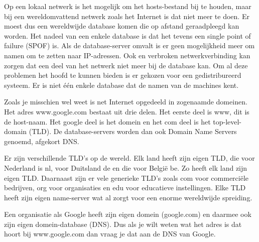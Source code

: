 Op een lokaal netwerk is het mogelijk om het hosts-bestand bij te houden, maar bij een wereldomvattend netwerk zoals het Internet is dat niet meer te doen. Er moest dus een wereldwijde database komen die op afstand geraadpleegd kan worden. Het nadeel van een enkele database is dat het tevens een single point of failure (SPOF) is. Als de database-server omvalt is er geen mogelijkheid meer om namen om te zetten naar IP-adressen. Ook en verbroken netwerkverbinding kan zorgen dat een deel van het netwerk niet meer bij de database kan. Om al deze problemen het hoofd te kunnen bieden is er gekozen voor een gedistribureerd systeem. Er is niet \'e\'en enkele database dat de namen van de machines kent.

Zoals je misschien wel weet is net Internet opgedeeld in zogenaamde domeinen. Het adres www.google.com bestaat uit drie delen. Het eerste deel is www, dit is de host-naam. Het google deel is het domein en het com deel is het top-level-domain (TLD). De database-servers worden dan ook Domain Name Servers genoemd, afgekort DNS.

Er zijn verschillende TLD's op de wereld. Elk land heeft zijn eigen TLD, die voor Nederland is nl, voor Duitsland de en die voor Belgi\"e be. Zo heeft elk land zijn eigen TLD. Daarnaast zijn er vele generieke TLD's zoals com voor commerci\"ele bedrijven, org voor organisaties en edu voor educatieve instellingen. Elke TLD heeft zijn eigen name-server wat al zorgt voor een enorme wereldwijde spreiding.

Een organisatie als Google heeft zijn eigen domein (google.com) en daarmee ook zijn eigen domein-database (DNS). Dus als je wilt weten wat het adres is dat hoort bij www.google.com dan vraag je dat aan de DNS van Google.



